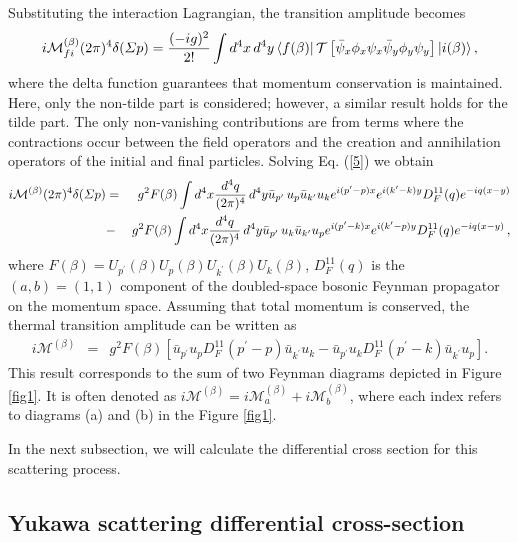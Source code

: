 \documentclass[11pt,showpacs,preprintnumbers,amsmath,amssymb,prd,nofootinbib,superscriptaddress]{revtex4-2}
\begin{document}
Substituting the interaction Lagrangian, the transition amplitude becomes
\begin{equation}
\label{5}
    i\mathcal{M}_{fi}^{(\beta)} (2\pi)^4 \delta (\Sigma p) = \frac{(-ig)^2}{2!}\int d^4x \, d^4y \bra{f(\beta)} \mathcal{T}\left[ \Bar{\psi}_x\phi _x\psi _x \Bar{\psi}_y \phi _y\psi _y\right] \ket{i(\beta)},
\end{equation}
where the delta function guarantees that momentum conservation is maintained. Here, only the non-tilde part is considered; however, a similar result holds for the tilde part. The only non-vanishing contributions are from terms where the contractions occur between the field operators and the creation and annihilation operators of the initial and final particles. 
Solving Eq. (\ref{5})  we obtain
\begin{eqnarray}
    \label{}
    \nonumber i\mathcal{M}^{(\beta)}(2\pi)^4 \delta (\Sigma p) &=&  g^2F(\beta)\int d^4x \frac{d^4q}{(2\pi)^4} \, d^4y \Bar{u}_{{p}^\prime}\, u_p \Bar{u}_{{k}^\prime} u_k e^{i(p^\prime-p)x} e^{i(k^\prime-k)y} D_F^{11}(q) e^{-iq(x-y)} \\
    &-& g^2F(\beta)\int d^4x \frac{d^4q}{(2\pi)^4} \, d^4y \Bar{u}_{{p}^\prime}\, u_k \Bar{u}_{{k}^\prime} u_p e^{i(p^\prime-k)x} e^{i(k^\prime-p)y} D_F^{11}(q) e^{-iq(x-y)} \, ,
\end{eqnarray}
 where $F(\beta)=U_{p^\prime}(\beta)U_{p}(\beta)U_{k^\prime}(\beta)U_{k}(\beta)$, $D^{11}_F(q)$ is the $(a,b)=(1,1)$ component of the doubled-space bosonic Feynman propagator on the momentum space. Assuming that total momentum is conserved, the thermal transition amplitude can be written as
\begin{eqnarray}
    i\mathcal{M}^{(\beta)}&=&g^2F(\beta)\left[\bar{u}_{p^\prime}u_pD_F^{11}(p^\prime-p)\bar{u}_{k^\prime}u_k-\bar{u}_{p^\prime}u_kD_F^{11}(p^\prime-k)\bar{u}_{k^\prime}u_p\right].\label{eq08}
\end{eqnarray}
This result corresponds to the sum of two Feynman diagrams depicted in Figure \ref{fig1}. It is often denoted as $i\mathcal{M}^{(\beta)}=i\mathcal{M}_{a}^{(\beta)}+i\mathcal{M}_{b}^{(\beta)}$, where each index refers to diagrams (a) and (b) in the Figure \ref{fig1}.

In the next subsection, we will calculate { the differential cross section for this scattering process.}


{ \subsection{Yukawa scattering differential cross-section}\label{seccross}}
\end{document}
